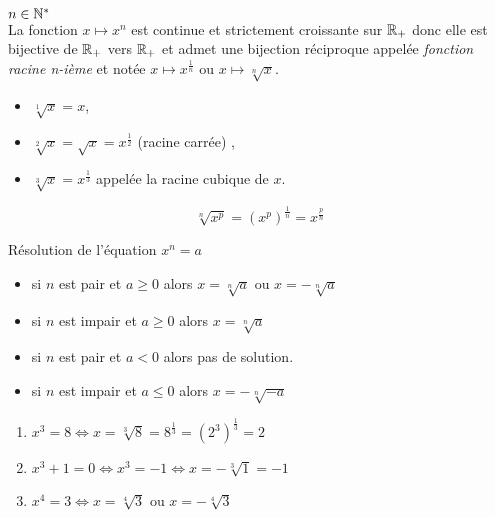 
\everymath{\displaystyle}

 \summary{}
   \begin{theorem}[et définition]
   
$ n\in \mathbb{N}^* $\\
La fonction $x\mapsto x^{n} $  est continue et strictement croissante sur $ \mathbb{R}_+ $  donc elle est bijective de $ \mathbb{R}_+ $ vers $ \mathbb{R}_+ $ et admet une bijection réciproque appelée \emph{fonction racine n-ième} et notée  $x\mapsto x^{\frac{1}{n}} $ ou $ x\mapsto \sqrt[n]{x} $.
\end{theorem}
\begin{example}
\begin{itemize}
\item $ \sqrt[1]{x}=x $,
\item  $ \sqrt[2]{x}=\sqrt{x}=x^{\frac{1}{2}}$\; (racine carrée) ,
\item  $ \sqrt[3]{x} =x^{\frac{1}{3}}$  appelée la racine cubique de $ x. $

\end{itemize}
\end{example}
\begin{notation}
\[\sqrt[n]{x^{p}}= (x^{p})^{\frac{1}{n}}= x^{\frac{p}{n}}\]
\end{notation}

 \colorbox{red!20!}{Résolution de l'équation $ x^{n}=a $}
\begin{itemize}
\item[\textbullet] si $ n $ est pair  et  $ a\geq 0 $ alors $ x= \sqrt[n]{a}$ ou $ x= -\sqrt[n]{a}$
\item[\textbullet] si $ n $ est impair  et  $ a\geq 0 $ alors $ x= \sqrt[n]{a}$
\item[\textbullet] si $ n $ est pair  et  $ a < 0 $ alors pas de solution. 
\item[\textbullet] si $ n $ est impair  et  $ a\leq 0 $ alors  $ x= -\sqrt[n]{-a}$
\end{itemize}

\begin{example}
\begin{enumerate}
\item $ x^3=8 \Longleftrightarrow x=\sqrt[3]{8}= 8^{\frac{1}{3}} = (2^3)^{\frac{1}{3}}=2$
\item $ x^3+1=0\Longleftrightarrow x^3=-1 \Longleftrightarrow x=-\sqrt[3]{1}= -1$
\item $ x^4= 3 \Longleftrightarrow x= \sqrt[4]{3}$ ou $ x= -\sqrt[4]{3} $  
 \end{enumerate}
\end{example}





